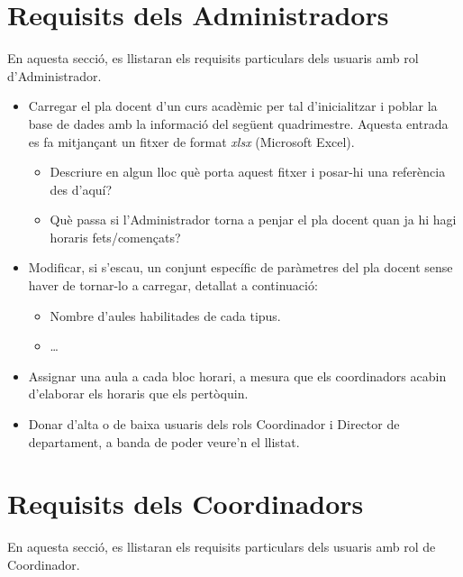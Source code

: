 \documentclass[a4paper,12pt]{ThesisStyle}
\begin{document}
\section{Requisits dels Administradors}
\label{sec:requisits_administradors}

En aquesta secció, es llistaran els requisits particulars dels usuaris amb rol d'Administrador.

\begin{itemize}
  \item Carregar el pla docent d'un curs acadèmic per tal d'inicialitzar i poblar la base de dades amb la informació del següent quadrimestre. Aquesta entrada es fa mitjançant un fitxer de format \emph{xlsx} (Microsoft Excel).
    \begin{itemize}
      \item Descriure en algun lloc què porta aquest fitxer i posar-hi una referència des d'aquí?
      \item Què passa si l'Administrador torna a penjar el pla docent quan ja hi hagi horaris fets/començats?
    \end{itemize}
  \item Modificar, si s'escau, un conjunt específic de paràmetres del pla docent sense haver de tornar-lo a carregar, detallat a continuació:
    \begin{itemize}
      \item Nombre d'aules habilitades de cada tipus.
      \item \ldots
    \end{itemize}
  \item Assignar una aula a cada bloc horari, a mesura que els coordinadors acabin d'elaborar els horaris que els pertòquin.
  \item Donar d'alta o de baixa usuaris dels rols Coordinador i Director de departament, a banda de poder veure'n el llistat.
\end{itemize}

\section{Requisits dels Coordinadors}
\label{sec:requisits_coordinadors}

En aquesta secció, es llistaran els requisits particulars dels usuaris amb rol de Coordinador.
\end{document}
